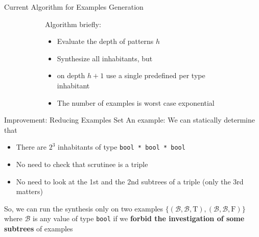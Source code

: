 \documentclass[aspectratio=169
  , xcolor={svgnames}
  , hyperref={ colorlinks,citecolor=Blue
             , linkcolor=DarkRed,urlcolor=DarkBlue}
  , russian
  ]{beamer}
\begin{document}
\begin{frame}{Current Algorithm for Examples Generation}
\begin{figure}
\begin{subfigure}[b]{0.75\linewidth}
Algorithm briefly:
\begin{itemize}
\item Evaluate the depth of patterns $h$
\item Synthesize all inhabitants, but
\item on depth $h+1$ use a single predefined per type inhabitant 
\end{itemize}
\vspace{1cm}

\begin{itemize}
\item[\faBad] The number of examples is  worst case exponential
\end{itemize}
\end{subfigure}
\hspace{.5cm}
\begin{subfigure}[b]{0.45\linewidth}
\end{subfigure}
\end{figure}

\end{frame}


\begin{frame}[fragile]{Improvement: Reducing Examples Set}
An example:
\improvementA
\vspace{1em}
We can statically determine that 

\begin{itemize}
\item There are $2^3$ inhabitants of type \lstinline=bool * bool * bool=
\item No need to  check that scrutinee is a triple
\item No need to look at the 1st and  the 2nd subtrees of a triple (only the 3rd matters)
\end{itemize}
\vspace{.5cm}


So, we can run the synthesis only on two examples $\{(\mathcal{B},\mathcal{B},\text{T}),(\mathcal{B},\mathcal{B},\text{F})\}$
where $\mathcal{B}$ is any value of type \lstinline=bool=
if we \textbf{forbid the investigation of  some subtrees} of examples
\end{frame}
\end{document}

